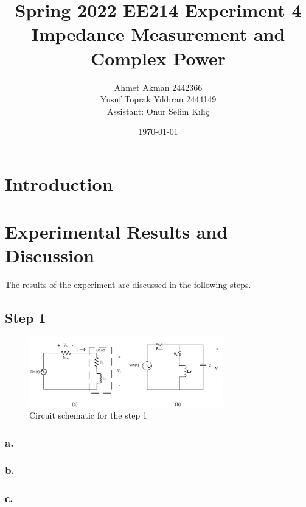 \documentclass[letterpaper,12pt]{article}
\begin{document}
\thispagestyle{empty}

\title{Spring 2022 EE214 Experiment 4  \protect\\ Impedance Measurement and Complex Power}
\author{Ahmet Akman 2442366 \protect\\ Yusuf Toprak Yıldıran 2444149 \protect\\ Assistant: Onur Selim Kılıç}
\date{\today}
\maketitle
\tableofcontents
\section{Introduction}
\section{Experimental Results and Discussion}
The results of the experiment are discussed in the following steps.
%
\subsection{Step 1}
\begin{figure}[H]
    \centering
    \includegraphics[width = 0.75\textwidth]{1SCH.png}
    \caption{Circuit schematic for the step 1}
\end{figure} 
    
\subsubsection{a.}

\subsubsection{b.}

\subsubsection{c.}
\end{document}
